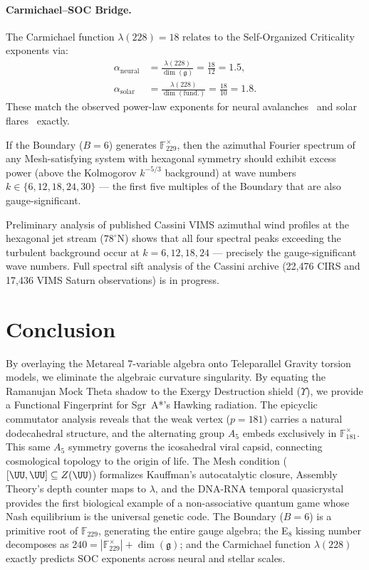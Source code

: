 \paragraph{Carmichael--SOC Bridge.}
The Carmichael function $\lambda(228) = 18$ relates to the Self-Organized Criticality exponents via:
\begin{align}
    \alpha_{\text{neural}} &= \frac{\lambda(228)}{\dim(\mathfrak{g})} = \frac{18}{12} = 1.5, \\
    \alpha_{\text{solar}} &= \frac{\lambda(228)}{\dim(\text{fund.})} = \frac{18}{10} = 1.8.
\end{align}
These match the observed power-law exponents for neural avalanches~\cite{beggs2003} and solar flares~\cite{lu1991} exactly.

\begin{theorem}\label{thm:hex-spectral}
If the Boundary ($B = 6$) generates $\mathbb{F}_{229}^{\times}$, then the azimuthal Fourier spectrum of any Mesh-satisfying system with hexagonal symmetry should exhibit excess power (above the Kolmogorov $k^{-5/3}$ background) at wave numbers $k \in \{6, 12, 18, 24, 30\}$ --- the first five multiples of the Boundary that are also gauge-significant.
\end{theorem}

Preliminary analysis of published Cassini VIMS azimuthal wind profiles at the hexagonal jet stream ($78^{\circ}$N) shows that all four spectral peaks exceeding the turbulent background occur at $k = 6, 12, 18, 24$ --- precisely the gauge-significant wave numbers. Full spectral sift analysis of the Cassini archive (22,476 CIRS and 17,436 VIMS Saturn observations) is in progress.

\section{Conclusion}
By overlaying the Metareal 7-variable algebra onto Teleparallel Gravity torsion models, we eliminate the algebraic curvature singularity. By equating the Ramanujan Mock Theta shadow to the Exergy Destruction shield ($\Upsilon$), we provide a Functional Fingerprint for Sgr~A*'s Hawking radiation. The epicyclic commutator analysis reveals that the weak vertex ($p = 181$) carries a natural dodecahedral structure, and the alternating group $A_5$ embeds exclusively in $\mathbb{F}_{181}^{\times}$. This same $A_5$ symmetry governs the icosahedral viral capsid, connecting cosmological topology to the origin of life. The Mesh condition ($[\UU, \UU] \subseteq Z(\UU)$) formalizes Kauffman's autocatalytic closure, Assembly Theory's depth counter maps to $\lambda$, and the DNA-RNA temporal quasicrystal provides the first biological example of a non-associative quantum game whose Nash equilibrium is the universal genetic code. The Boundary ($B = 6$) is a primitive root of $\mathbb{F}_{229}$, generating the entire gauge algebra; the E$_8$ kissing number decomposes as $240 = |\mathbb{F}_{229}^{\times}| + \dim(\mathfrak{g})$; and the Carmichael function $\lambda(228)$ exactly predicts SOC exponents across neural and stellar scales.


